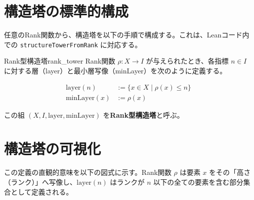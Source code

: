 \documentclass[report, paper=a4, fontsize=11pt, openany]{jlreq}
\newcommand{\layer}{\mathrm{layer}}
\newcommand{\minLayer}{\mathrm{minLayer}}
\newcommand{\rank}{\rho}
\begin{document}
\section{構造塔の標準的構成}

任意のRank関数から、構造塔を以下の手順で構成する。これは、Leanコード内での \texttt{structureTowerFromRank} に対応する。

\begin{definition}{Rank型構造塔}{rank_tower}
Rank関数 $\rank: X \to I$ が与えられたとき、各指標 $n \in I$ に対する層（layer）と最小層写像（minLayer）を次のように定義する。

\begin{align}
    \layer(n) &:= \{ x \in X \mid \rank(x) \le n \} \\
    \minLayer(x) &:= \rank(x)
\end{align}

この組 $(X, I, \layer, \minLayer)$ を\textbf{Rank型構造塔}と呼ぶ。
\end{definition}

\section{構造塔の可視化}

この定義の直観的意味を以下の図式に示す。Rank関数 $\rank$ は要素 $x$ をその「高さ（ランク）」へ写像し、$\layer(n)$ はランクが $n$ 以下の全ての要素を含む部分集合として定義される。
\end{document}
